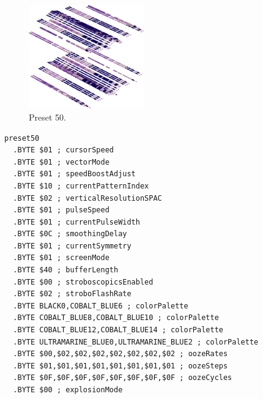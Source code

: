\vspace*{0.5cm}
\begin{minipage}[b]{0.48\linewidth}
\begin{figure}[H]                                                          
  \centering                                                             
  \begin{adjustbox}{width=5cm,center}                                   
  \includegraphics[width=5cm]{src/colorspace_presets/preset50-45.png}%
  \end{adjustbox}                                                        
\caption*{Preset 50.}                                           
\end{figure}                                                               
\end{minipage}
\hspace{0.1cm}
\begin{minipage}[b]{0.48\linewidth}                                                                         
\begin{lstlisting}[basicstyle=\ttfamily\tiny]
preset50
  .BYTE $01 ; cursorSpeed
  .BYTE $01 ; vectorMode
  .BYTE $01 ; speedBoostAdjust
  .BYTE $10 ; currentPatternIndex
  .BYTE $02 ; verticalResolutionSPAC
  .BYTE $01 ; pulseSpeed
  .BYTE $01 ; currentPulseWidth
  .BYTE $0C ; smoothingDelay
  .BYTE $01 ; currentSymmetry
  .BYTE $01 ; screenMode
  .BYTE $40 ; bufferLength
  .BYTE $00 ; stroboscopicsEnabled
  .BYTE $02 ; stroboFlashRate
  .BYTE BLACK0,COBALT_BLUE6 ; colorPalette
  .BYTE COBALT_BLUE8,COBALT_BLUE10 ; colorPalette
  .BYTE COBALT_BLUE12,COBALT_BLUE14 ; colorPalette
  .BYTE ULTRAMARINE_BLUE0,ULTRAMARINE_BLUE2 ; colorPalette
  .BYTE $00,$02,$02,$02,$02,$02,$02,$02 ; oozeRates
  .BYTE $01,$01,$01,$01,$01,$01,$01,$01 ; oozeSteps
  .BYTE $0F,$0F,$0F,$0F,$0F,$0F,$0F,$0F ; oozeCycles
  .BYTE $00 ; explosionMode
\end{lstlisting}
\end{minipage}


